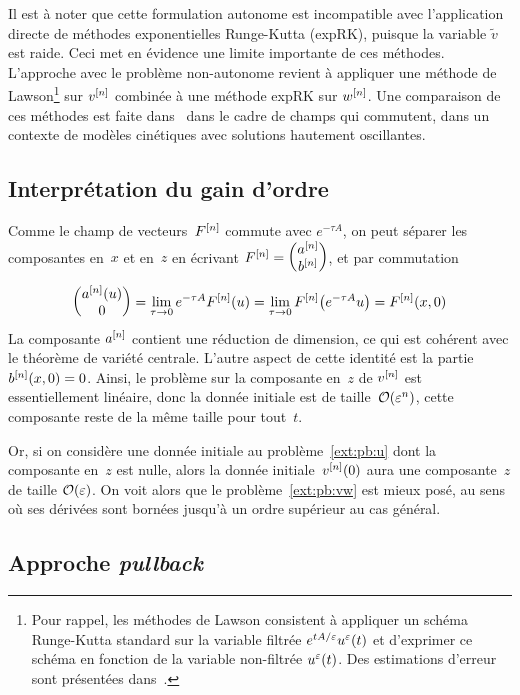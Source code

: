 Il est à noter que cette formulation autonome est incompatible avec l'application directe de méthodes exponentielles Runge-Kutta (expRK), puisque la variable $\tilde{v}$ est raide. Ceci met en évidence une limite importante de ces méthodes. L'approche avec le problème non-autonome revient à appliquer une méthode de Lawson\footnote{Pour rappel, les méthodes de Lawson consistent à appliquer un schéma Runge-Kutta standard sur la variable filtrée $e^{tA/\varepsilon} u^\varepsilon(t)$ et d'exprimer ce schéma en fonction de la variable non-filtrée $u^\varepsilon(t)$. Des estimations d'erreur sont présentées dans~\cite{hochbruck.2020.convergence}.} sur $v^{[n]}$ combinée à une méthode expRK sur $w^{[n]}$. Une comparaison de ces méthodes est faite dans~\cite{crouseilles.2020.exponential} dans le cadre de champs qui commutent, dans un contexte de modèles cinétiques avec solutions hautement oscillantes.


\subsection{Interprétation du gain d'ordre}

Comme le champ de vecteurs~$F^{[n]}$ commute avec $e^{-\tau A}$, on peut séparer les composantes en~$x$ et en~$z$ en écrivant $F^{[n]} = \begin{pmatrix} a^{[n]} \\ b^{[n]} \end{pmatrix}$, et par commutation
\begin{equation*}
    \begin{pmatrix} a^{[n]}(u) \\ 0 \end{pmatrix} 
    = \lim_{\tau \rightarrow 0} e^{-\tau A} F^{[n]} (u)
    = \lim_{\tau \rightarrow 0} F^{[n]} \big( e^{-\tau A} u \big)
    = F^{[n]} (x, 0)
\end{equation*}
La composante $a^{[n]}$ contient une réduction de dimension, ce qui est cohérent avec le théorème de variété centrale. L'autre aspect de cette identité est la partie $b^{[n]}(x,0) = 0$. Ainsi, le problème sur la composante en~$z$ de $v^{[n]}$ est essentiellement linéaire, donc la donnée initiale est de taille~$\mathcal{O}(\varepsilon^n)$, cette composante reste de la même taille pour tout~$t$. 

Or, si on considère une donnée initiale au problème~\eqref{ext:pb:u} dont la composante en~$z$ est nulle, alors la donnée initiale~$v^{[n]} (0)$ aura une composante~$z$ de taille $\mathcal{O}(\varepsilon)$. On voit alors que le problème~\eqref{ext:pb:vw} est mieux posé, au sens où ses dérivées sont bornées jusqu'à un ordre supérieur au cas général. 


\subsection{Approche \textit{pullback}}

